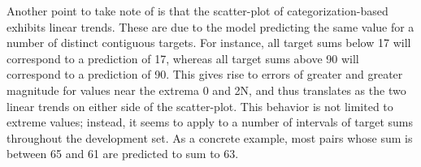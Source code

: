 \documentclass[twocolumn]{article}
\begin{document}
Another point to take note of is that the scatter-plot of categorization-based exhibits linear trends.
These are due to the model predicting the same value for a number of distinct contiguous targets.
For instance, all target sums below 17 will correspond to a prediction of 17, whereas all target sums above 90 will correspond to a prediction of 90.
This gives rise to errors of greater and greater magnitude for values near the extrema 0 and 2N, and thus translates as the two linear trends on either side of the scatter-plot.
This behavior is not limited to extreme values; instead, it seems to apply to a number of intervals of target sums throughout the development set.
As a concrete example, most pairs whose sum is between 65 and 61 are predicted to sum to 63.

\begin{table}%
    \centering
    \qquad
    \caption{\label{tab:topo} Topographic similarity scores}
\end{table}
\end{document}
